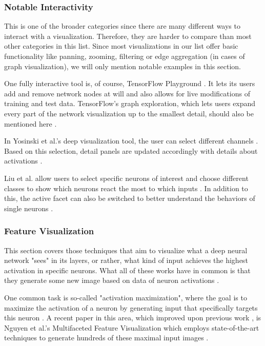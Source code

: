 \documentclass{acmsiggraph}               %
\begin{document}
\subsubsection{Notable Interactivity}
This is one of the broader categories since there are many different ways to interact with a visualization. Therefore, they are harder to compare than most other categories in this list. Since most visualizations in our list offer basic functionality like panning, zooming, filtering or edge aggregation (in cases of graph visualization), we will only mention notable examples in this section.

One fully interactive tool is, of course, TensorFlow Playground \cite{Smilkov2017}. It lets its users add and remove network nodes at will and also allows for live modifications of training and test data. TensorFlow's graph exploration, which lets users expand every part of the network visualization up to the smallest detail, should also be mentioned here \cite{Wongsuphasawat2018}.

In Yosinski et al.'s deep visualization tool, the user can select different channels \cite{Yosinski2015}. Based on this selection, detail panels are updated accordingly with details about activations \cite{Yosinski2015}.

Liu et al. allow users to select specific neurons of interest and choose different classes to show which neurons react the most to which inputs \cite{Liu2016}. In addition to this, the active facet can also be switched to better understand the behaviors of single neurons \cite{Liu2016}.
\subsubsection{Feature Visualization}
This section covers those techniques that aim to visualize what a deep neural network "sees" in its layers, or rather, what kind of input achieves the highest activation in specific neurons. What all of these works have in common is that they generate some new image based on data of neuron activations \cite{Hohman2018}.

One common task is so-called "activation maximization", where the goal is to maximize the activation of a neuron by generating input that specifically targets this neuron \cite{Hohman2018}. A recent paper in this area, which improved upon previous work \cite{Erhan2009}, is Nguyen et al.'s Multifaceted Feature Visualization which employs state-of-the-art techniques to generate hundreds of these maximal input images \cite{Hohman2018,Nguyen2016}. 
\end{document}
